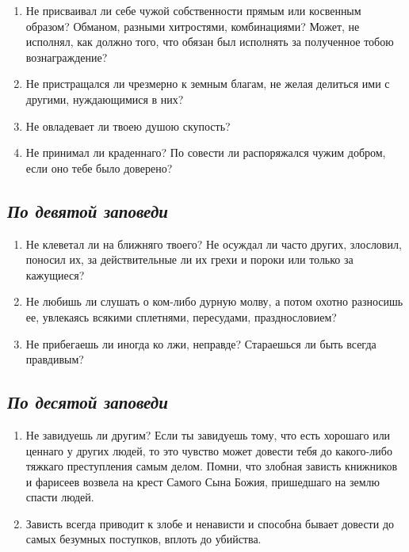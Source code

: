 \begin{enumerate}

\item Не присваивал ли себе чужой собственности прямым или косвенным образом? Обманом, разными хитростями, комбинациями? Может, не исполнял, как должно того, что обязан был исполнять за полученное тобою вознаграждение?

\item Не пристращался ли чрезмерно к земным благам, не желая делиться ими с другими, нуждающимися в них?

\item Не овладевает ли твоею душою скупость?

\item Не принимал ли краденнаго? По совести ли распоряжался чужим добром, если оно тебе было доверено? 

\end{enumerate}

\subsection*{\itshape По девятой заповеди}

\begin{enumerate}

\item Не клеветал ли на ближняго твоего? Не осуждал ли часто других, злословил, поносил их, за действительные ли их грехи и пороки или только за кажущиеся?

\item Не любишь ли слушать о ком-либо дурную молву, а потом охотно разносишь ее, увлекаясь всякими сплетнями, пересудами, празднословием?

\item Не прибегаешь ли иногда ко лжи, неправде? Стараешься ли быть всегда правдивым? 
\end{enumerate}

\subsection*{\itshape По десятой заповеди}

\begin{enumerate}

\item Не завидуешь ли другим? Если ты завидуешь тому, что есть хорошаго или ценнаго у других людей, то это чувство может довести тебя до какого-либо тяжкаго преступления самым делом. Помни, что злобная зависть книжников и фарисеев возвела на крест Самого Сына Божия, пришедшаго на землю спасти людей.

\item Зависть всегда приводит к злобе и ненависти и способна бывает довести до самых безумных поступков, вплоть до убийства.

\end{enumerate}

